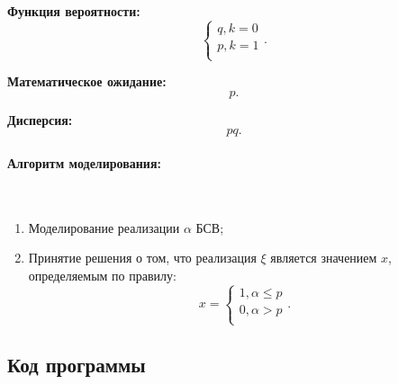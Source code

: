 \textbf{Функция вероятности:}
\begin{equation}
	\begin{cases}{}
		q, k = 0 \\
		p, k = 1 \\
	\end{cases}.
\end{equation}

\textbf{Математическое ожидание:}
\begin{equation}
	p.
\end{equation}

\textbf{Дисперсия:}
\begin{equation}
	pq.
\end{equation}

\paragraph{Алгоритм моделирования:}\
\

\begin{enumerate}
	\item Моделирование реализации $\alpha$ БСВ;
	\item Принятие решения о том, что реализация $\xi$ является значением $x$, определяемым по правилу:
	      \begin{equation}
		      x =
		      \begin{cases}{}
			      1, \alpha \leqslant p \\
			      0, \alpha > p         \\
		      \end{cases}.
	      \end{equation}
\end{enumerate}

\subsection{Код программы}


